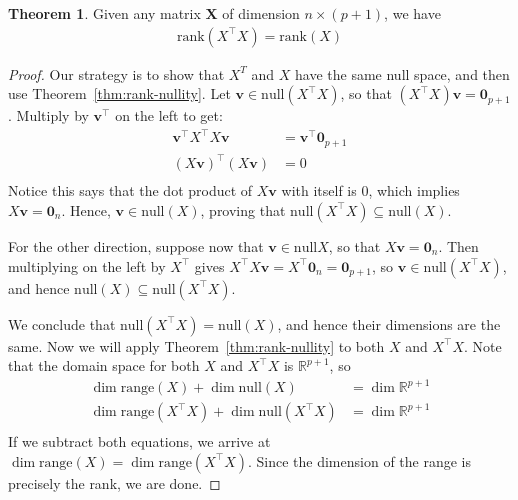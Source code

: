 \documentclass[12pt, a4paper]{article}
\theoremstyle{definition}
\newtheorem{theorem}{Theorem}
\begin{document}
	\begin{tcolorbox}[breakable]
		\begin{theorem}
			\label{thm:rank-XTX}
			Given any matrix $\mathbf{X}$ of dimension $n\times (p+1)$, we have
			\begin{align*}
				\text{rank}(X^\top X)= \text{rank}(X)
			\end{align*}
		\end{theorem}
		\begin{proof}
			Our strategy is to show that $X^T$ and $X$ have the same null space, and then use
			Theorem~\ref{thm:rank-nullity}. Let $\mathbf{v}\in \text{null}(X^\top X)$,
			so that $(X^\top X)\mathbf{v}=\mathbf{0}_{p+1}$. Multiply by $\mathbf{v}^\top$
			on the left to get:
			\begin{align*}
				\mathbf{v}^\top X^\top X\mathbf{v} &= \mathbf{v}^\top \mathbf{0}_{p+1}\\
				(X\mathbf{v})^\top (X\mathbf{v}) &= 0\\
			\end{align*}
			Notice this says that the dot product of $X\mathbf{v}$ with itself is $0$,
			which implies $X\mathbf{v}=\mathbf{0}_n$. Hence, $\mathbf{v}\in \text{null}(X)$,
			proving that $\text{null}(X^\top X)\subseteq \text{null}(X)$.
			
			For the other direction, suppose now that $\mathbf{v}\in \text{null} X$, so
			that $X\mathbf{v}=\mathbf{0}_n$. Then multiplying on the left by $X^\top$ gives
			$X^\top X\mathbf{v}=X^\top \mathbf{0}_{n}=\mathbf{0}_{p+1}$, so
			$\mathbf{v}\in \text{null}(X^\top X)$, and hence $\text{null}(X)\subseteq \text{null}(X^\top X)$.
			
			We conclude that $\text{null}(X^\top X)=\text{null}(X)$, and hence their dimensions
			are the same. Now we will apply Theorem~\ref{thm:rank-nullity} to both $X$ and $X^\top X$.
			Note that the domain space for both $X$ and $X^\top X$ is $\mathbb{R}^{p+1}$, so
			\begin{align*}
				\dim \text{range}(X) + \dim\text{null}(X) &= \dim \mathbb{R}^{p+1}\\
				\dim \text{range}(X^\top X) + \dim\text{null}(X^\top X) &= \dim \mathbb{R}^{p+1}\\
			\end{align*}
			If we subtract both equations, we arrive at $\dim \text{range}(X)=\dim\text{range}(X^\top X)$.
			Since the dimension of the range is precisely the rank, we are done.
		\end{proof}
	\end{tcolorbox}
\end{document}
